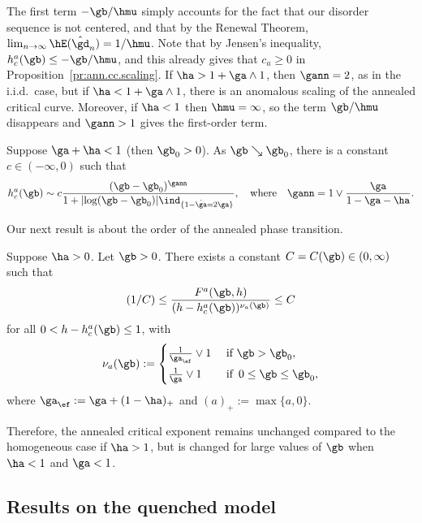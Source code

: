 The first term $- \gb / \hmu$ simply accounts for the fact that our disorder sequence is not centered, and that by the Renewal Theorem, $\lim_{n \to \infty} \hE(\hat \gd_n) = 1 / \hmu$. Note that by Jensen's inequality, $h_c^a(\gb) \leq - \gb / \hmu$, and this already gives that $c_a \geq 0$ in Proposition~\ref{pr:ann.cc.scaling}. If $\ha > 1 + \ga \wedge 1$, then $\gann = 2$, as in the i.i.d.~case, but if $\ha < 1 + \ga \wedge 1$, there is an anomalous scaling of the annealed critical curve. Moreover, if $\ha <1$ then $\hmu = \infty$, so the term $\gb/\hmu$ disappears and $\gann >1$ gives the first-order term.

\begin{prop}\label{pr:ann.cc.scaling2}
Suppose $\ga + \ha < 1$ (then $\gb_0 > 0$). As $\gb \searrow \gb_0$, there is a constant $c \in (- \infty,0)$ such that
\begin{equation}
h_c^a(\gb) \sim c\frac{(\gb - \gb_0)^{\gann}}{1+|{\log(\gb-\gb_0)}|\ind_{\{1-\hat \ga=2\ga\}}}, \quad \text{where} \quad
\gann = 1 \vee \frac{\ga}{1 - \ga - \ha}.
\end{equation}
\end{prop}

Our next result is about the order of the annealed phase transition.
\begin{prop} \label{ACExp}
Suppose $\ha > 0$. Let $\gb > 0$. There exists a constant $C = C(\gb) \in (0,\infty)$ such that
\begin{equation}\label{ACExpRelation}
(1/C) \leq \frac{F^a(\gb,h)}{(h - h_c^a(\gb))^{\nu_a(\gb)}} \leq C
\end{equation}
for all $0 < h - h_c^a(\gb) \leq 1$, with
\begin{equation}
\nu_a(\gb) :=
\begin{cases}
\frac{1}{\ga_{\ef}} \vee 1 & \text{ if } \gb > \gb_0,\\[4pt]
\frac{1}{\ga} \vee 1 & \text{ if } \, 0 \leq \gb \leq \gb_0,
\end{cases}
\end{equation}
where $\ga_\ef := \ga + (1 - \ha)_+$ and $(a)_+ := \max\{a,0\}$.
\end{prop}

Therefore, the annealed critical exponent remains unchanged compared to the homogeneous case if $\ha > 1$, but is changed for large values of $\gb$ when $\ha < 1$ and $\ga < 1$.

\subsection{Results on the quenched model} \label{sec2.2}

